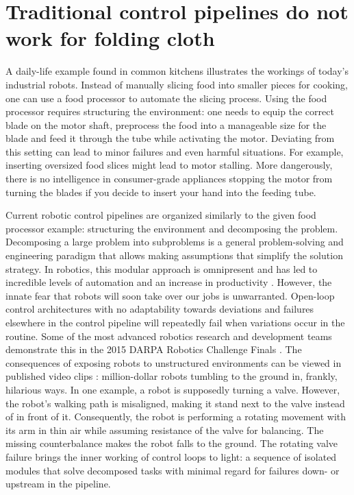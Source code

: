 \documentclass[\home/main.tex]{subfiles}
\begin{document}
\section{Traditional control pipelines do not work for folding cloth}
A daily-life example found in common kitchens illustrates the workings of today's industrial robots. Instead of manually slicing food into smaller pieces for cooking, one can use a food processor to automate the slicing process.
Using the food processor requires structuring the environment: one needs to equip the correct blade on the motor shaft, preprocess the food into a manageable size for the blade and feed it through the tube while activating the motor. Deviating from this setting can lead to minor failures and even harmful situations. For example, inserting oversized food slices might lead to motor stalling. More dangerously, there is no intelligence in consumer-grade appliances stopping the motor from turning the blades if you decide to insert your hand into the feeding tube.

Current robotic control pipelines are organized similarly to the given food processor example: structuring the environment and decomposing the problem. Decomposing a large problem into subproblems is a general problem-solving and engineering paradigm that allows making assumptions that simplify the solution strategy. In robotics, this modular approach is omnipresent and has led to incredible levels of automation and an increase in productivity \autocite{Graetz2018}. However, the innate fear that robots will soon take over our jobs \autocite{cave2019hopes} is unwarranted.
Open-loop control architectures with no adaptability towards deviations and failures elsewhere in the control pipeline will repeatedly fail when variations occur in the routine. Some of the most advanced robotics research and development teams demonstrate this in the 2015 DARPA Robotics Challenge Finals \autocite{DARPA2015}. The consequences of exposing robots to unstructured environments can be viewed in published video clips \autocite{darpaVideos}: million-dollar robots tumbling to the ground in, frankly, hilarious ways. In one example, a robot is supposedly turning a valve. However, the robot's walking path is misaligned, making it stand next to the valve instead of in front of it. Consequently, the robot is performing a rotating movement with its arm in thin air while assuming resistance of the valve for balancing. The missing counterbalance makes the robot falls to the ground. The rotating valve failure brings the inner working of control loops to light: a sequence of isolated modules that solve decomposed tasks with minimal regard for failures down- or upstream in the pipeline.
\end{document}
